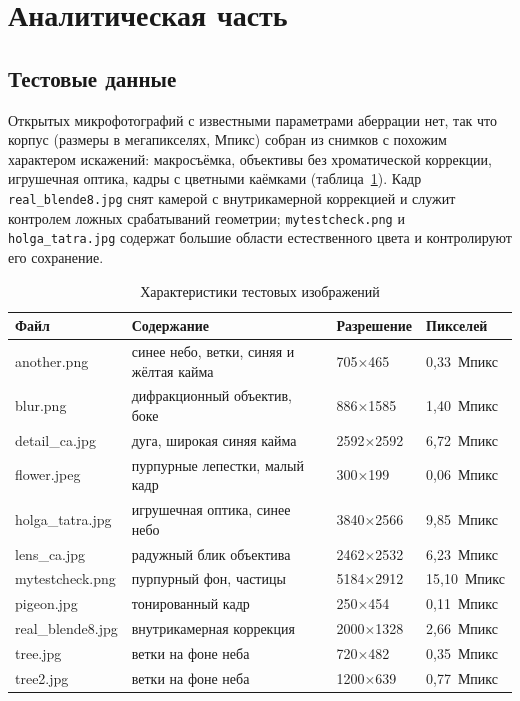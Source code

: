 \documentclass[a4paper,14pt,oneside]{extreport}
\begin{document}
\section{Аналитическая часть}

\subsection{Тестовые данные}

Открытых микрофотографий с известными параметрами аберрации нет, так что
корпус (размеры в мегапикселях, Мпикс) собран из снимков с похожим характером искажений: макросъёмка,
объективы без хроматической коррекции, игрушечная оптика, кадры с цветными
каёмками (таблица~\ref{tab:data}). Кадр \texttt{real\_blende8.jpg} снят
камерой с внутрикамерной коррекцией и служит контролем ложных срабатываний
геометрии; \texttt{mytestcheck.png} и \texttt{holga\_tatra.jpg} содержат
большие области естественного цвета и контролируют его сохранение.

\begin{table}[H]
\caption{Характеристики тестовых изображений}
\label{tab:data}
\small
\begin{tabular}{|p{3.4cm}|p{6.2cm}|p{2.5cm}|p{2.3cm}|}
\hline
Файл & Содержание & Разрешение & Пикселей \\
\hline
another.png & синее небо, ветки, синяя и жёлтая кайма & 705$\times$465 & 0,33~Мпикс \\
\hline
blur.png & дифракционный объектив, боке & 886$\times$1585 & 1,40~Мпикс \\
\hline
detail\_ca.jpg & дуга, широкая синяя кайма & 2592$\times$2592 & 6,72~Мпикс \\
\hline
flower.jpeg & пурпурные лепестки, малый кадр & 300$\times$199 & 0,06~Мпикс \\
\hline
holga\_tatra.jpg & игрушечная оптика, синее небо & 3840$\times$2566 & 9,85~Мпикс \\
\hline
lens\_ca.jpg & радужный блик объектива & 2462$\times$2532 & 6,23~Мпикс \\
\hline
mytestcheck.png & пурпурный фон, частицы & 5184$\times$2912 & 15,10~Мпикс \\
\hline
pigeon.jpg & тонированный кадр & 250$\times$454 & 0,11~Мпикс \\
\hline
real\_blende8.jpg & внутрикамерная коррекция & 2000$\times$1328 & 2,66~Мпикс \\
\hline
tree.jpg & ветки на фоне неба & 720$\times$482 & 0,35~Мпикс \\
\hline
tree2.jpg & ветки на фоне неба & 1200$\times$639 & 0,77~Мпикс \\
\hline
\end{tabular}
\end{table}
\end{document}
